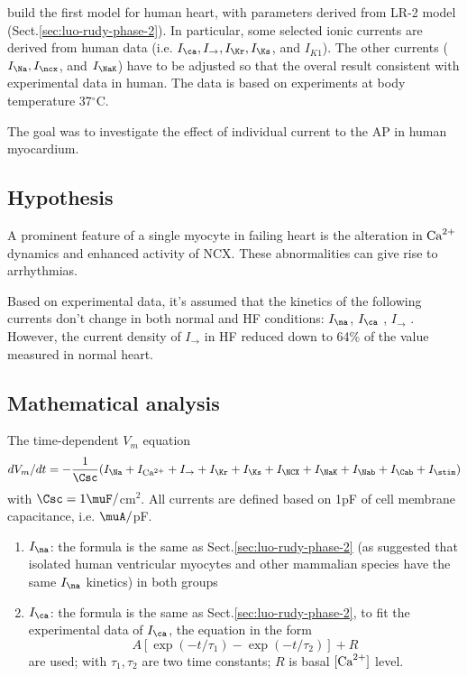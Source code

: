\citep{priebe1998} build the first model for human heart, with parameters
derived from LR-2 model (Sect.\ref{sec:luo-rudy-phase-2}). In particular, some
selected ionic currents are derived from human data (i.e. $I_\ca, I_\to, I_\Kr,
I_\Ks$, and $I_{K1}$). The other currents ($I_\Na, I_\ncx$, and $I_\NaK$) have
to be adjusted so that the overal result consistent with experimental data in
human. The data is based on experiments at body temperature 37$^\circ$C.

The goal was to investigate the effect of individual current to the AP in human
myocardium.

\subsection{Hypothesis}

A prominent feature of a single myocyte in failing heart is the alteration in
${\text{Ca}^{2+}}$ dynamics and enhanced activity of NCX. These abnormalities can give rise
to arrhythmias. 

Based on experimental data, it's assumed that the kinetics of the following
currents don't change in both normal and HF conditions: $I_\na$, $I_\ca$
\citep{15,16,18}, $I_\to$ \citep{14}. However, the current density of $I_\to$
in HF reduced down to 64\% of the value measured in normal heart.

\subsection{Mathematical analysis}

The time-dependent $V_m$ equation
\begin{equation}
dV_m/dt = -\frac{1}{\Csc} (I_\Na + I_\Ca + I_\to + I_\Kr + I_\Ks + I_\NCX +
I_\NaK + I_\Nab + I_\Cab + I_\stim)
\end{equation}
with $\Csc=1\muF/$cm$^2$. All currents are defined based on 1pF of cell membrane
capacitance, i.e. $\muA/$pF.

\begin{enumerate}
  \item $I_\na$: the formula is the same as Sect.\ref{sec:luo-rudy-phase-2} (as
  \citep{sakakibara1993} suggested that isolated human ventricular myocytes and
  other mammalian species have the same $I_\na$ kinetics) in both groups 
  \item $I_\ca$: the formula is the same as Sect.\ref{sec:luo-rudy-phase-2}, to
  fit the experimental data of $I_\ca$, the equation in the form 
  \begin{equation}
  A \left[\exp(-t/\tau_1) - \exp(-t/\tau_2) \right] + R
  \end{equation} 
  are used; with $\tau_1, \tau_2$ are two time constants; $R$ is basal $[{\text{Ca}^{2+}}]$
  level.
\end{enumerate}

